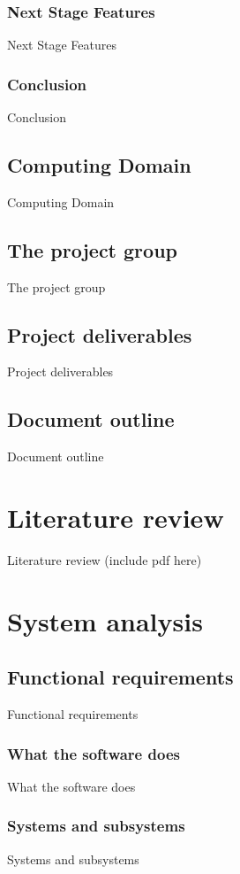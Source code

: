 \documentclass[12pt]{report}
\begin{document}
\section{Next Stage Features}
Next Stage Features

\section{Conclusion}
Conclusion

\chapter{Computing Domain}
Computing Domain

\chapter{The project group}
The project group

\chapter{Project deliverables}
Project deliverables

\chapter{Document outline}
Document outline

\part{Literature review}
Literature review
(include pdf here)

\part{System analysis}

\chapter{Functional requirements}
Functional requirements

\section{What the software does}
What the software does

\section{Systems and subsystems}
Systems and subsystems
\end{document}
